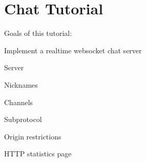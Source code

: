 \chapter{Chat Tutorial}
\hypertarget{md_libraries_2fc_2vendor_2websocketpp_2tutorials_2chat__tutorial_2chat__tutorial}{}\label{md_libraries_2fc_2vendor_2websocketpp_2tutorials_2chat__tutorial_2chat__tutorial}
Goals of this tutorial\+:
\begin{DoxyItemize}
\item Implement a realtime websocket chat server
\end{DoxyItemize}

Server
\begin{DoxyItemize}
\item Nicknames
\item Channels
\item Subprotocol
\item Origin restrictions
\item HTTP statistics page 
\end{DoxyItemize}